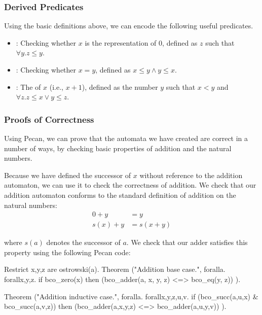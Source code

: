 

\subsubsection{Derived Predicates}

Using the basic definitions above, we can encode the following useful predicates.

\begin{itemize}
    \item {}: Checking whether $x$ is the representation of $0$, defined as $z$ such that $\forall y. z \leq y$.
    
    \item {}: Checking whether $x = y$, defined as $x \leq y \land y \leq x$.
    
    \item {}: The  of $x$ (i.e., $x + 1$), defined as the number $y$ such that $x < y$ and $\forall z. z \leq x \lor y \leq z$.
\end{itemize}

\subsubsection{Proofs of Correctness}


Using Pecan, we can prove that the automata we have created are correct in a number of ways, by checking basic properties of addition and the natural numbers.

Because we have defined the successor of $x$ without reference to the addition automaton, we can use it to check the correctness of addition.
We check that our addition automaton conforms to the standard definition of addition on the natural numbers:
\begin{align*}
    0 + y &= y \\
    s(x) + y &= s(x + y)
\end{align*}

where $s(a)$ denotes the successor of $a$.
We check that our adder satisfies this property using the following Pecan code:

\begin{pecan}
Restrict x,y,z are ostrowski(a).
Theorem ("Addition base case.", {
    foralla. forallx,y,z. 
    if bco_zero(x) then 
        (bco_adder(a, x, y, z) <=> bco_eq(y, z))
}).

Theorem ("Addition inductive case.", {
    foralla. forallx,y,z,u,v. 
    if (bco_succ(a,u,x) & bco_succ(a,v,z)) then 
        (bco_adder(a,x,y,z) <=> bco_adder(a,u,y,v))
}).
\end{pecan}

